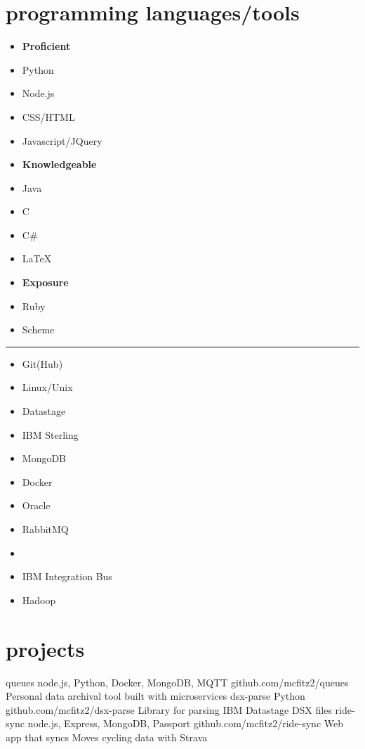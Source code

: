 \documentclass[]{friggeri-cv} %
\begin{document}
\section{programming languages/tools}
\vspace{-0.3cm}
\begin{multicols}{3}
 \begin{itemize}[noitemsep,nolistsep]
     \item[] \textbf{Proficient}
     \item[] Python
     \item[] Node.js
     \item[] CSS/HTML
     \item[] Javascript/JQuery
     \item[] \textbf{Knowledgeable }
     \item[] Java
     \item[] C
     \item[] C\#
     \item[] \LaTeX
     \item[] \textbf{Exposure}
     \item[] Ruby
     \item[] Scheme
 \end{itemize}
\end{multicols}
\vspace{-0.5cm}
\textcolor{lightgray}{\rule{15cm}{0.3pt}}
\begin{multicols}{3}
 \begin{itemize}[noitemsep,nolistsep]
     \item[] Git(Hub)
     \item[] Linux/Unix
     \item[] Datastage
   	 \item[] IBM Sterling
     \item[] MongoDB
     \item[] Docker
     \item[] Oracle 
     \item[] RabbitMQ
     \item[] 
     \item[] IBM Integration Bus
     \item[] Hadoop
 
 \end{itemize}
\end{multicols}
\section{projects}
\vspace{-0.2cm}
 \begin{entrylist}
 \entry
     {queues}
     {node.js, Python, Docker, MongoDB, MQTT}
     {github.com/mcfitz2/queues}
     {Personal data archival tool built with microservices}
     {}
 \entry
     {dsx-parse}
     {Python}
     {github.com/mcfitz2/dsx-parse}
     {Library for parsing IBM Datastage DSX files}
     {}
    \entry
     {ride-sync}
     {node.js, Express, MongoDB, Passport}
     {github.com/mcfitz2/ride-sync}
     {Web app that syncs Moves cycling data with Strava}
     {}
 \end{entrylist}
\end{document}
